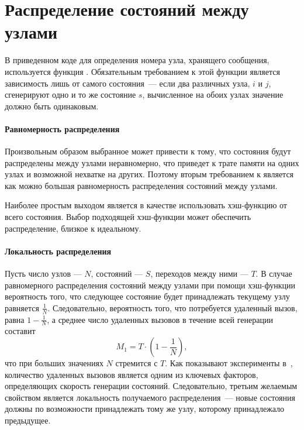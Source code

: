 \section{Распределение состояний между узлами}
\label{sec:state-partition}

В приведенном коде для определения номера узла, хранящего сообщения, используется функция
. Обязательным требованием к этой функции является зависимость лишь от
самого состояния~--- если два различных узла, $i$ и $j$, сгенерируют одно и то же состояние
$s$, вычисленное на обоих узлах значение  должно быть одинаковым.

\paragraph{Равномерность распределения}

Произвольным образом выбранное  может привести к тому, что состояния будут
распределены между узлами неравномерно, что приведет к трате памяти на одних узлах и
возможной нехватке на других. Поэтому вторым требованием к  является как
можно большая равномерность распределения состояний между узлами. 

Наиболее простым выходом является в качестве  использовать хэш-функцию от
всего состояния. Выбор подходящей хэш-функции может обеспечить распределение, близкое к
идеальному.

\paragraph{Локальность распределения}

Пусть число узлов — $N$, состояний — $S$, переходов между ними — $T$. В случае
равномерного распределения состояний между узлами при помощи хэш-функции вероятность того,
что следующее состояние будет принадлежать текущему узлу равняется
$\frac{1}{N}$. Следовательно, вероятность того, что потребуется удаленный вызов, равна $1
- \frac{1}{N}$, а среднее число удаленных вызовов в течение всей генерации составит
\begin{equation}
  \label{eq:nmsg-full-hash}
  M_1 = T \cdot (1 - \frac{1}{N}) ,
\end{equation}
что при больших значениях $N$ стремится с $T$. Как показывают эксперименты в~\cite{LS99},
количество удаленных вызовов является одним из ключевых факторов, определяющих скорость
генерации состояний. Следовательно, третьим желаемым свойством  является
локальность получаемого распределения~--- новые состояния должны по возможности
принадлежать тому же узлу, которому принадлежало предыдущее.

